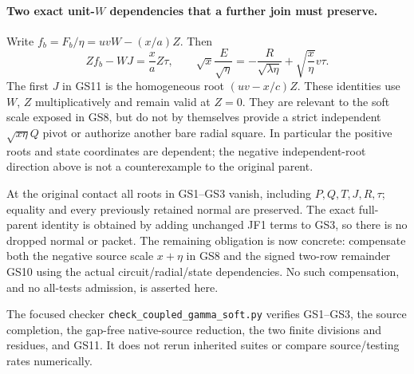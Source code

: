 \paragraph{Two exact unit-$W$ dependencies that a further join must preserve.}
Write $f_b=F_b/\eta=uvW-(x/a)Z$. Then
\[
 Zf_b-WJ=\frac{x}{a}Z\tau,
 \qquad
 \sqrt{x}\frac E{\sqrt\eta}
       =-\frac{R}{\sqrt{\lambda\eta}}
                  +\sqrt{\frac{x}{\eta}}v\tau.      \tag{GS11}
\]
The first $J$ in GS11 is the homogeneous root $(uv-x/c)Z$.
These identities use $W$, $Z$ multiplicatively and remain valid at
$Z=0$. They are relevant to the soft scale exposed in GS8, but do
not by themselves provide a strict independent $\sqrt{x\eta}Q$
pivot or authorize another bare radial square. In particular the
positive roots and state coordinates are dependent; the negative
independent-root direction above is not a counterexample to the
original parent.

At the original contact all roots in GS1--GS3 vanish, including
$P,Q,T,J,R,\tau$; equality and every previously retained normal are
preserved. The exact full-parent identity is obtained by adding
unchanged JF1 terms to GS3, so there is no dropped normal or packet.
The remaining obligation is now concrete: compensate both the
negative source scale $x+\eta$ in GS8 and the signed two-row
remainder GS10 using the actual circuit/radial/state dependencies.
No such compensation, and no all-tests admission, is asserted here.

The focused checker \texttt{check\_coupled\_gamma\_soft.py} verifies
GS1--GS3, the source completion, the gap-free native-source reduction,
the two finite divisions and residues, and GS11. It does not rerun
inherited suites or compare source/testing rates numerically.

